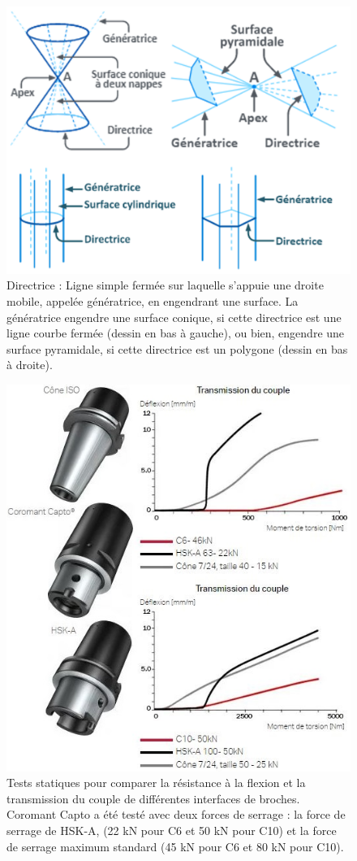 \documentclass[12pt]{article}
\begin{document}
\begin{figure}
\centering
\includegraphics[width=0.9\linewidth]{Images/directrice.png}
\caption{Directrice : Ligne simple fermée sur laquelle s’appuie une droite mobile, appelée génératrice, en engendrant une surface. La génératrice engendre une surface conique, si cette directrice est une ligne courbe fermée (dessin en bas à gauche), ou bien, engendre une surface pyramidale, si cette directrice est un polygone (dessin en bas à droite).}
\label{directrice}
\end{figure}


\begin{figure}
\centering
\includegraphics[width=0.8\linewidth]{Images/T11.JPG}
\caption{Tests statiques pour comparer la résistance à la flexion et la transmission du couple de différentes interfaces de broches. Coromant Capto a été testé avec deux forces de serrage : la force de serrage de HSK-A, (22 kN pour C6 et 50 kN pour C10) et la force de serrage maximum standard (45 kN pour C6 et 80 kN pour C10).}
\label{T11}
\end{figure}
\end{document}
